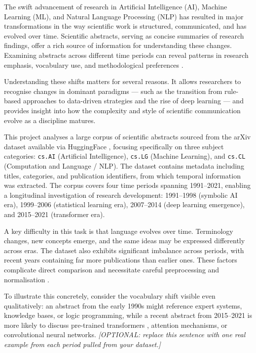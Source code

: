 \documentclass{article}
\begin{document}
The swift advancement of research in Artificial Intelligence
(AI), Machine Learning (ML), and Natural Language Processing
(NLP) has resulted in major transformations in the way
scientific work is structured, communicated, and has evolved
over time. Scientific abstracts, serving as concise summaries
of research findings, offer a rich source of information for
understanding these changes. Examining abstracts across
different time periods can reveal patterns in research
emphasis, vocabulary use, and methodological preferences
\citep{arxiv2020}.

Understanding these shifts matters for several reasons. It
allows researchers to recognise changes in dominant
paradigms — such as the transition from rule-based approaches
to data-driven strategies and the rise of deep learning
\citep{devlin-etal-2019-bert} — and provides insight into
how the complexity and style of scientific communication
evolve as a discipline matures.

This project analyses a large corpus of scientific abstracts
sourced from the arXiv dataset available via HuggingFace
\citep{arxiv2020}, focusing specifically on three subject
categories: \texttt{cs.AI} (Artificial Intelligence),
\texttt{cs.LG} (Machine Learning), and \texttt{cs.CL}
(Computation and Language / NLP). The dataset contains
metadata including titles, categories, and publication
identifiers, from which temporal information was extracted.
The corpus covers four time periods spanning 1991--2021,
enabling a longitudinal investigation of research
development: 1991--1998 (symbolic AI era), 1999--2006
(statistical learning era), 2007--2014 (deep learning
emergence), and 2015--2021 (transformer era).

A key difficulty in this task is that language evolves over
time. Terminology changes, new concepts emerge, and the same
ideas may be expressed differently across eras. The dataset
also exhibits significant imbalance across periods, with
recent years containing far more publications than earlier
ones. These factors complicate direct comparison and
necessitate careful preprocessing and normalisation
\citep{scikit-learn, nltk}.

To illustrate this concretely, consider the vocabulary
shift visible even qualitatively: an abstract from the
early 1990s might reference expert systems, knowledge bases,
or logic programming, while a recent abstract from 2015--2021
is more likely to discuss pre-trained transformers
\citep{devlin-etal-2019-bert}, attention mechanisms, or
convolutional neural networks.
\textit{[OPTIONAL: replace this sentence with one real
example from each period pulled from your dataset.]}
\end{document}
